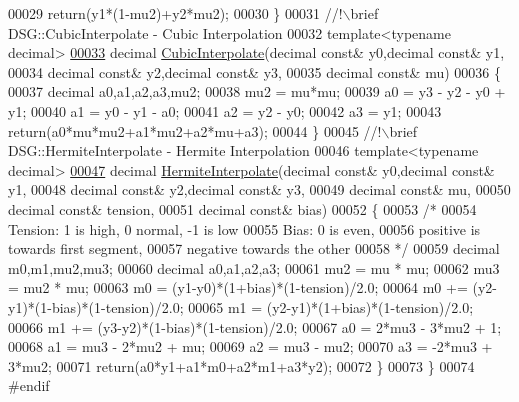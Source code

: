 \begin{DoxyCode}
00029         \textcolor{keywordflow}{return}(y1*(1-mu2)+y2*mu2);
00030     \}\textcolor{comment}{}
00031 \textcolor{comment}{    //!\(\backslash\)brief DSG::CubicInterpolate - Cubic Interpolation}
00032 \textcolor{comment}{}    \textcolor{keyword}{template}<\textcolor{keyword}{typename} decimal>
\hypertarget{_interpolate_8h_source_l00033}{}\hyperlink{namespace_d_s_g_a7c61e97fb15300de270eb32d51cdc849}{00033}     decimal \hyperlink{namespace_d_s_g_a7c61e97fb15300de270eb32d51cdc849}{CubicInterpolate}(decimal \textcolor{keyword}{const}& y0,decimal \textcolor{keyword}{const}& y1,
00034                              decimal \textcolor{keyword}{const}& y2,decimal \textcolor{keyword}{const}& y3,
00035                              decimal \textcolor{keyword}{const}& mu)
00036     \{
00037         decimal a0,a1,a2,a3,mu2;
00038         mu2 = mu*mu;
00039         a0 = y3 - y2 - y0 + y1;
00040         a1 = y0 - y1 - a0;
00041         a2 = y2 - y0;
00042         a3 = y1;
00043         \textcolor{keywordflow}{return}(a0*mu*mu2+a1*mu2+a2*mu+a3);
00044     \}\textcolor{comment}{}
00045 \textcolor{comment}{    //!\(\backslash\)brief DSG::HermiteInterpolate - Hermite Interpolation}
00046 \textcolor{comment}{}    \textcolor{keyword}{template}<\textcolor{keyword}{typename} decimal>
\hypertarget{_interpolate_8h_source_l00047}{}\hyperlink{namespace_d_s_g_ae1b0502c523a1a123bdde9aa33ebbb77}{00047}     decimal \hyperlink{namespace_d_s_g_ae1b0502c523a1a123bdde9aa33ebbb77}{HermiteInterpolate}(decimal \textcolor{keyword}{const}& y0,decimal \textcolor{keyword}{const}& y1,
00048                               decimal \textcolor{keyword}{const}& y2,decimal \textcolor{keyword}{const}& y3,
00049                               decimal \textcolor{keyword}{const}& mu,
00050                               decimal \textcolor{keyword}{const}& tension,
00051                               decimal \textcolor{keyword}{const}& bias)
00052     \{
00053         \textcolor{comment}{/*}
00054 \textcolor{comment}{         Tension: 1 is high, 0 normal, -1 is low}
00055 \textcolor{comment}{         Bias: 0 is even,}
00056 \textcolor{comment}{         positive is towards first segment,}
00057 \textcolor{comment}{         negative towards the other}
00058 \textcolor{comment}{         */}
00059         decimal m0,m1,mu2,mu3;
00060         decimal a0,a1,a2,a3;
00061         mu2 = mu * mu;
00062         mu3 = mu2 * mu;
00063         m0  = (y1-y0)*(1+bias)*(1-tension)/2.0;
00064         m0 += (y2-y1)*(1-bias)*(1-tension)/2.0;
00065         m1  = (y2-y1)*(1+bias)*(1-tension)/2.0;
00066         m1 += (y3-y2)*(1-bias)*(1-tension)/2.0;
00067         a0 =  2*mu3 - 3*mu2 + 1;
00068         a1 =    mu3 - 2*mu2 + mu;
00069         a2 =    mu3 -   mu2;
00070         a3 = -2*mu3 + 3*mu2;
00071         \textcolor{keywordflow}{return}(a0*y1+a1*m0+a2*m1+a3*y2);
00072     \}
00073 \}
00074 \textcolor{preprocessor}{#endif}
\end{DoxyCode}
